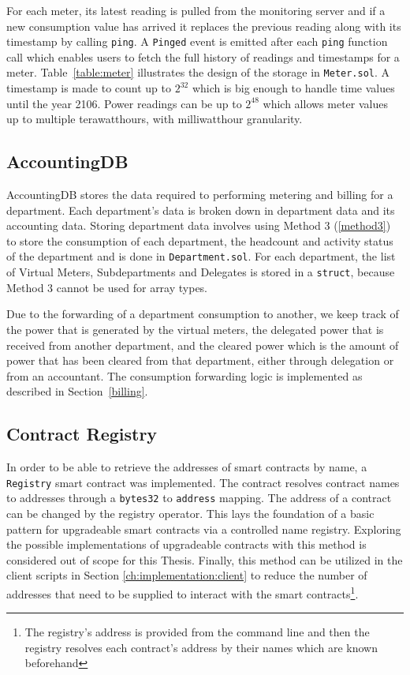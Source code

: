 For each meter, its latest reading is pulled from the monitoring server and if a new consumption value has arrived it replaces the previous reading along with its timestamp by calling \texttt{ping}. A \texttt{Pinged} event is emitted after each \texttt{ping} function call which enables users to fetch the full history of readings and timestamps for a meter. Table~\ref{table:meter} illustrates the design of the storage in \texttt{Meter.sol}. A timestamp is made to count up to $2^{32}$ which is big enough to handle time values until the year 2106. Power readings can be up to $2^{48}$ which allows meter values up to multiple terawatthours, with milliwatthour granularity.



\subsection{AccountingDB}

AccountingDB stores the data required to performing metering and billing for a department. Each department's data is broken down in department data and its accounting data. Storing department data involves using Method 3 (\ref{method3}) to store the consumption of each department, the headcount and activity status of the department and is done in \texttt{Department.sol}. For each department, the list of Virtual Meters, Subdepartments and Delegates is stored in a \texttt{struct}, because Method 3 cannot be used for array types.

Due to the forwarding of a department consumption to another, we keep track of the power that is generated by the virtual meters, the delegated power that is received from another department, and the cleared power which is the amount of power that has been cleared from that department, either through delegation or from an accountant. The consumption forwarding logic is implemented as described in Section~\ref{billing}. 



\subsection{Contract Registry} 

In order to be able to retrieve the addresses of smart contracts by name, a \texttt{Registry} smart contract was implemented. The contract resolves contract names to addresses through a \texttt{bytes32} to \texttt{address} mapping. The address of a contract can be changed by the registry operator. This lays the foundation of a basic pattern for upgradeable smart contracts via a controlled name registry. Exploring the possible implementations of upgradeable contracts with this method is considered out of scope for this Thesis. Finally, this method can be utilized in the client scripts in Section \ref{ch:implementation:client} to reduce the number of addresses that need to be supplied to interact with the smart contracts\footnote{The registry's address is provided from the command line and then the registry resolves each contract's address by their names which are known beforehand}.

